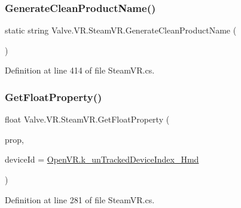 \mbox{\label{class_valve_1_1_v_r_1_1_steam_v_r_a8e23ccbdd8fdb8e26f0c3c9f3ea8e159}} 
\subsubsection{\texorpdfstring{GenerateCleanProductName()}{GenerateCleanProductName()}}
{\footnotesize\ttfamily static string Valve.\+V\+R.\+Steam\+V\+R.\+Generate\+Clean\+Product\+Name (\begin{DoxyParamCaption}{ }\end{DoxyParamCaption})\hspace{0.3cm}{\ttfamily [static]}}



Definition at line 414 of file Steam\+V\+R.\+cs.

\mbox{\label{class_valve_1_1_v_r_1_1_steam_v_r_a05f845baaf8d6e9cfe4c9fb39970f305}} 
\subsubsection{\texorpdfstring{GetFloatProperty()}{GetFloatProperty()}}
{\footnotesize\ttfamily float Valve.\+V\+R.\+Steam\+V\+R.\+Get\+Float\+Property (\begin{DoxyParamCaption}\item[{\mbox{\hyperlink{namespace_valve_1_1_v_r_ab060521ead7273986988fc4897e52482}{E\+Tracked\+Device\+Property}}}]{prop,  }\item[{uint}]{device\+Id = {\ttfamily \mbox{\hyperlink{class_valve_1_1_v_r_1_1_open_v_r_ae12d105c6f832aa4524e2608b26896e0}{Open\+V\+R.\+k\+\_\+un\+Tracked\+Device\+Index\+\_\+\+Hmd}}} }\end{DoxyParamCaption})}



Definition at line 281 of file Steam\+V\+R.\+cs.

\mbox{\label{class_valve_1_1_v_r_1_1_steam_v_r_aa666244fcba18f8449b71660f4f39a79}} 

